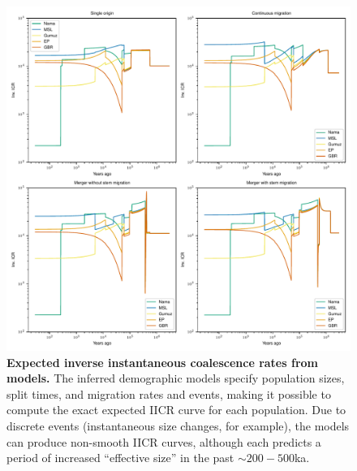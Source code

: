 \documentclass[]{article}
\begin{document}
\begin{figure}[ht]
    \centering
    \includegraphics[width=\textwidth]{figures/supp-exp-coal-rates}
    \caption{
        \textbf{Expected inverse instantaneous coalescence rates from models.}
        The inferred demographic models specify population sizes, split times,
        and migration rates and events, making it possible to compute the exact
        expected IICR curve for each population. Due to discrete events
        (instantaneous size changes, for example), the models can produce
        non-smooth IICR curves, although each predicts a period of increased
        ``effective size'' in the past $\sim200-500$ka.
    }
    \label{fig:supp-iicr-exp}
\end{figure}
\end{document}
